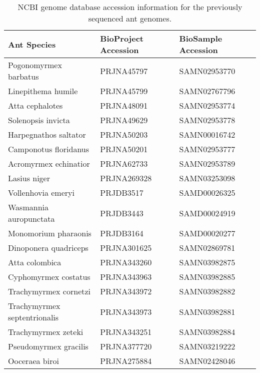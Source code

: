 \begin{table}[ht]
\centering
\begin{tabular}{lll}
  \hline
Ant Species & BioProject Accession & BioSample Accession \\ 
  \hline
Pogonomyrmex barbatus & PRJNA45797 & SAMN02953770 \\ 
  Linepithema humile & PRJNA45799 & SAMN02767796 \\ 
  Atta cephalotes & PRJNA48091 & SAMN02953774 \\ 
  Solenopsis invicta & PRJNA49629 & SAMN02953778 \\ 
  Harpegnathos saltator & PRJNA50203 & SAMN00016742 \\ 
  Camponotus floridanus & PRJNA50201 & SAMN02953777 \\ 
  Acromyrmex echinatior & PRJNA62733 & SAMN02953789 \\ 
  Lasius niger & PRJNA269328 & SAMN03253098 \\ 
  Vollenhovia emeryi & PRJDB3517 & SAMD00026325 \\ 
  Wasmannia auropunctata & PRJDB3443 & SAMD00024919 \\ 
  Monomorium pharaonis & PRJDB3164 & SAMD00020277 \\ 
  Dinoponera quadriceps & PRJNA301625 & SAMN02869781 \\ 
  Atta colombica & PRJNA343260 & SAMN03982875 \\ 
  Cyphomyrmex costatus & PRJNA343963 & SAMN03982885 \\ 
  Trachymyrmex cornetzi & PRJNA343972 & SAMN03982882 \\ 
  Trachymyrmex septentrionalis & PRJNA343973 & SAMN03982881 \\ 
  Trachymyrmex zeteki & PRJNA343251 & SAMN03982884 \\ 
  Pseudomyrmex gracilis & PRJNA377720 & SAMN03219222 \\ 
  Ooceraea biroi & PRJNA275884 & SAMN02428046 \\ 
   \hline
\end{tabular}
\caption{NCBI genome database accession information for the previously sequenced ant genomes.} 
\end{table}
